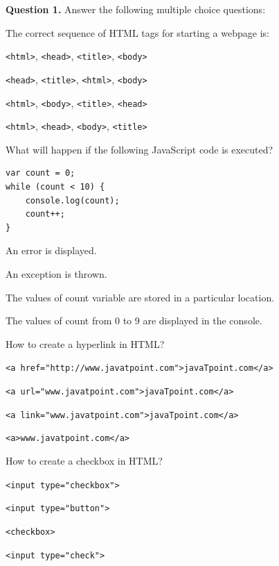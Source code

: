 \documentclass[11pt,a4paper]{article}
\begin{document}
\medskip\noindent\textbf{Question 1.} Answer the following multiple choice questions:
\begin{parts}
  \item The correct sequence of HTML tags for starting a webpage is:
  \begin{parts}
    \item \texttt{<html>}, \texttt{<head>}, \texttt{<title>}, \texttt{<body>}
    \item \texttt{<head>}, \texttt{<title>}, \texttt{<html>}, \texttt{<body>}
    \item \texttt{<html>}, \texttt{<body>}, \texttt{<title>}, \texttt{<head>}
    \item \texttt{<html>}, \texttt{<head>}, \texttt{<body>}, \texttt{<title>}
  \end{parts}

  \item What will happen if the following JavaScript code is executed?
  \begin{lstlisting}
var count = 0;
while (count < 10) {
    console.log(count);
    count++;
}
  \end{lstlisting}
  \begin{parts}
    \item An error is displayed.
    \item An exception is thrown.
    \item The values of count variable are stored in a particular location.
    \item The values of count from 0 to 9 are displayed in the console.
  \end{parts}

  \item How to create a hyperlink in HTML?
  \begin{parts}
    \item \texttt{<a href="http://www.javatpoint.com">javaTpoint.com</a>}
    \item \texttt{<a url="www.javatpoint.com">javaTpoint.com</a>}
    \item \texttt{<a link="www.javatpoint.com">javaTpoint.com</a>}
    \item \texttt{<a>www.javatpoint.com</a>}
  \end{parts}

  \item How to create a checkbox in HTML?
  \begin{parts}
    \item \texttt{<input type="checkbox">}
    \item \texttt{<input type="button">}
    \item \texttt{<checkbox>}
    \item \texttt{<input type="check">}
  \end{parts}


\end{parts}
\end{document}
